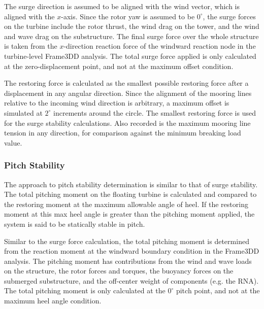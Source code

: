 The surge direction is assumed to be aligned with the wind vector, which
is aligned with the $x$-axis.  Since the rotor yaw is assumed to be
$0^{\circ}$, the surge forces on the turbine include the rotor thrust,
the wind drag on the tower, and the wind and wave drag on the
substructure.  The final surge force over the whole structure is taken
from the $x$-direction reaction force of the windward reaction node in
the turbine-level Frame3DD analysis.  The total surge force applied is
only calculated at the zero-displacement point, and not at the maximum
offset condition.

The restoring force is calculated as the smallest possible restoring
force after a displacement in any angular direction.  Since the
alignment of the mooring lines relative to the incoming wind direction
is arbitrary, a maximum offset is simulated at $2^{\circ}$ increments
around the circle.  The smallest restoring force is used for the surge
stability calculations.  Also recorded is the maximum mooring line
tension in any direction, for comparison against the minimum breaking
load value.

\subsubsection{Pitch Stability}
The approach to pitch stability determination is similar to that of
surge stability.  The total pitching moment on the floating turbine is
calculated and compared to the restoring moment at the maximum allowable
angle of heel.  If the restoring moment at this max heel angle is
greater than the pitching moment applied, the system is said to be
statically stable in pitch.

Similar to the surge force calculation, the total pitching moment is
determined from the reaction moment at the windward boundary condition
in the Frame3DD analysis.  The pitching moment has contributions from
the wind and wave loads on the structure, the rotor forces and torques,
the buoyancy forces on the submerged substructure, and the off-center
weight of components (e.g. the RNA).  The total pitching moment is only
calculated at the $0^{\circ}$ pitch point, and not at the maximum heel
angle condition.

